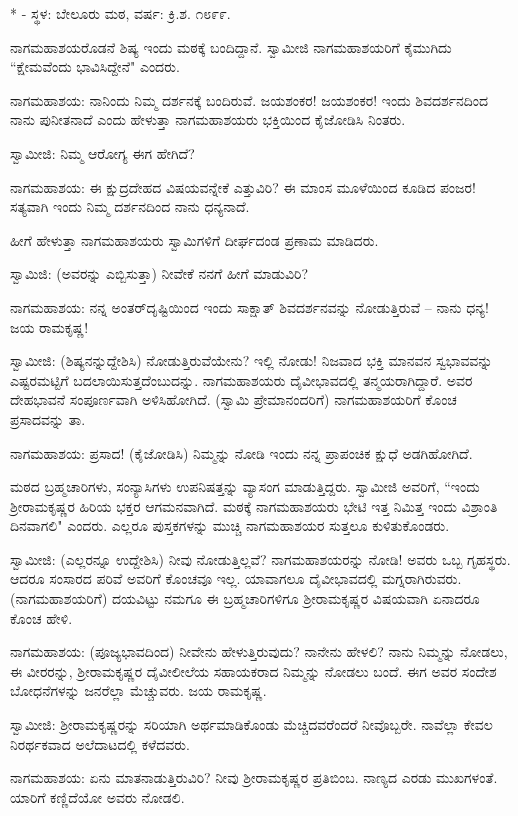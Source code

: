 \begin{center}
* - ಸ್ಥಳ: ಬೇಲೂರು ಮಠ, ವರ್ಷ: ಕ್ರಿ.ಶ. ೧೮೯೯.
\end{center}

ನಾಗಮಹಾಶಯರೊಡನೆ ಶಿಷ್ಯ ಇಂದು ಮಠಕ್ಕೆ ಬಂದಿದ್ದಾನೆ. ಸ್ವಾಮೀಜಿ ನಾಗಮಹಾಶಯರಿಗೆ ಕೈಮುಗಿದು “ಕ್ಷೇಮವೆಂದು ಭಾವಿಸಿದ್ದೇನೆ" ಎಂದರು.

ನಾಗಮಹಾಶಯ: ನಾನಿಂದು ನಿಮ್ಮ ದರ್ಶನಕ್ಕೆ ಬಂದಿರುವೆ. ಜಯಶಂಕರ! ಜಯಶಂಕರ! ಇಂದು ಶಿವದರ್ಶನದಿಂದ ನಾನು ಪುನೀತನಾದೆ ಎಂದು ಹೇಳುತ್ತಾ ನಾಗಮಹಾಶಯರು ಭಕ್ತಿಯಿಂದ ಕೈಜೋಡಿಸಿ ನಿಂತರು.

ಸ್ವಾಮೀಜಿ: ನಿಮ್ಮ ಆರೋಗ್ಯ ಈಗ ಹೇಗಿದೆ?

ನಾಗಮಹಾಶಯ: ಈ ಕ್ಷುದ್ರದೇಹದ ವಿಷಯವನ್ನೇಕೆ ಎತ್ತುವಿರಿ? ಈ ಮಾಂಸ ಮೂಳೆಯಿಂದ ಕೂಡಿದ ಪಂಜರ! ಸತ್ಯವಾಗಿ ಇಂದು ನಿಮ್ಮ ದರ್ಶನದಿಂದ ನಾನು ಧನ್ಯನಾದೆ.

ಹೀಗೆ ಹೇಳುತ್ತಾ ನಾಗಮಹಾಶಯರು ಸ್ವಾಮಿಗಳಿಗೆ ದೀರ್ಘದಂಡ ಪ್ರಣಾಮ ಮಾಡಿದರು.

ಸ್ವಾಮಿಜಿ: (ಅವರನ್ನು ಎಬ್ಬಿಸುತ್ತಾ) ನೀವೇಕೆ ನನಗೆ ಹೀಗೆ ಮಾಡುವಿರಿ?

ನಾಗಮಹಾಶಯ: ನನ್ನ ಅಂತರ್‌ದೃಷ್ಟಿಯಿಂದ ಇಂದು ಸಾಕ್ಷಾತ್ ಶಿವದರ್ಶನವನ್ನು ನೋಡುತ್ತಿರುವೆ – ನಾನು ಧನ್ಯ! ಜಯ ರಾಮಕೃಷ್ಣ!

ಸ್ವಾಮೀಜಿ: (ಶಿಷ್ಯನನ್ನುದ್ದೇಶಿಸಿ) ನೋಡುತ್ತಿರುವೆಯೇನು? ಇಲ್ಲಿ ನೋಡು! ನಿಜವಾದ ಭಕ್ತಿ ಮಾನವನ ಸ್ವಭಾವವನ್ನು ಎಷ್ಟರಮಟ್ಟಿಗೆ ಬದಲಾಯಿಸುತ್ತದೆಂಬುದನ್ನು. ನಾಗಮಹಾಶಯರು ದೈವೀಭಾವದಲ್ಲಿ ತನ್ಮಯರಾಗಿದ್ದಾರೆ. ಅವರ ದೇಹಭಾವನೆ ಸಂಪೂರ್ಣವಾಗಿ ಅಳಿಸಿಹೋಗಿದೆ. (ಸ್ವಾಮಿ ಪ್ರೇಮಾನಂದರಿಗೆ) ನಾಗಮಹಾಶಯರಿಗೆ ಕೊಂಚ ಪ್ರಸಾದವನ್ನು ತಾ.

ನಾಗಮಹಾಶಯ: ಪ್ರಸಾದ! (ಕೈಜೋಡಿಸಿ) ನಿಮ್ಮನ್ನು ನೋಡಿ ಇಂದು ನನ್ನ ಪ್ರಾಪಂಚಿಕ ಕ್ಷುಧೆ ಅಡಗಿಹೋಗಿದೆ.

ಮಠದ ಬ್ರಹ್ಮಚಾರಿಗಳು, ಸಂನ್ಯಾಸಿಗಳು ಉಪನಿಷತ್ತನ್ನು ವ್ಯಾಸಂಗ ಮಾಡುತ್ತಿದ್ದರು. ಸ್ವಾಮೀಜಿ ಅವರಿಗೆ, “ಇಂದು ಶ‍್ರೀರಾಮಕೃಷ್ಣರ ಹಿರಿಯ ಭಕ್ತರ ಆಗಮನವಾಗಿದೆ. ಮಠಕ್ಕೆ ನಾಗಮಹಾಶಯರು ಭೇಟಿ ಇತ್ತ ನಿಮಿತ್ತ ಇಂದು ವಿಶ್ರಾಂತಿ ದಿನವಾಗಲಿ" ಎಂದರು. ಎಲ್ಲರೂ ಪುಸ್ತಕಗಳನ್ನು ಮುಚ್ಚಿ ನಾಗಮಹಾಶಯರ ಸುತ್ತಲೂ ಕುಳಿತುಕೊಂಡರು.

ಸ್ವಾಮೀಜಿ: (ಎಲ್ಲರನ್ನೂ ಉದ್ದೇಶಿಸಿ) ನೀವು ನೋಡುತ್ತಿಲ್ಲವೆ? ನಾಗಮಹಾಶಯರನ್ನು ನೋಡಿ! ಅವರು ಒಬ್ಬ ಗೃಹಸ್ಥರು. ಆದರೂ ಸಂಸಾರದ ಪರಿವೆ ಅವರಿಗೆ ಕೊಂಚವೂ ಇಲ್ಲ. ಯಾವಾಗಲೂ ದೈವೀಭಾವದಲ್ಲಿ ಮಗ್ನರಾಗಿರುವರು. (ನಾಗಮಹಾಶಯರಿಗೆ) ದಯವಿಟ್ಟು ನಮಗೂ ಈ ಬ್ರಹ್ಮಚಾರಿಗಳಿಗೂ ಶ‍್ರೀರಾಮಕೃಷ್ಣರ ವಿಷಯವಾಗಿ ಏನಾದರೂ ಕೊಂಚ ಹೇಳಿ.

ನಾಗಮಹಾಶಯ: (ಪೂಜ್ಯಭಾವದಿಂದ) ನೀವೇನು ಹೇಳುತ್ತಿರುವುದು? ನಾನೇನು ಹೇಳಲಿ? ನಾನು ನಿಮ್ಮನ್ನು ನೋಡಲು, ಈ ವೀರರನ್ನು, ಶ‍್ರೀರಾಮಕೃಷ್ಣರ ದೈವೀಲೀಲೆಯ ಸಹಾಯಕರಾದ ನಿಮ್ಮನ್ನು ನೋಡಲು ಬಂದೆ. ಈಗ ಅವರ ಸಂದೇಶ ಬೋಧನೆಗಳನ್ನು ಜನರೆಲ್ಲಾ ಮೆಚ್ಚುವರು. ಜಯ ರಾಮಕೃಷ್ಣ.

ಸ್ವಾಮೀಜಿ: ಶ‍್ರೀರಾಮಕೃಷ್ಣರನ್ನು ಸರಿಯಾಗಿ ಅರ್ಥಮಾಡಿಕೊಂಡು ಮೆಚ್ಚಿದವರೆಂದರೆ ನೀವೊಬ್ಬರೇ. ನಾವೆಲ್ಲಾ ಕೇವಲ ನಿರರ್ಥಕವಾದ ಅಲೆದಾಟದಲ್ಲಿ ಕಳೆದವರು.

ನಾಗಮಹಾಶಯ: ಏನು ಮಾತನಾಡುತ್ತಿರುವಿರಿ? ನೀವು ಶ‍್ರೀರಾಮಕೃಷ್ಣರ ಪ್ರತಿಬಿಂಬ. ನಾಣ್ಯದ ಎರಡು ಮುಖಗಳಂತೆ. ಯಾರಿಗೆ ಕಣ್ಣಿದೆಯೋ ಅವರು ನೋಡಲಿ.

